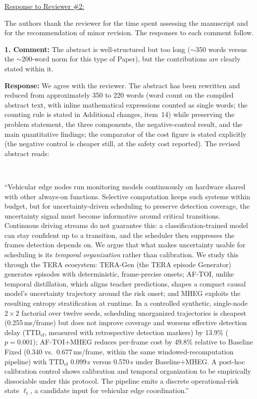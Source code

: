 \documentclass[1p,12pt,authoryear]{elsarticle}
\begin{document}
\newpage


\begin{large}
\noindent \underline{Response to Reviewer \#2:}
\end{large}

\vspace{10pt}

\noindent The authors thank the reviewer for the time spent assessing the manuscript and for the recommendation of minor revision. The responses to each comment follow.

\vspace{0.5cm}
\noindent \textbf{1. Comment:} The abstract is well-structured but too long ($\sim$350 words versus the $\sim$200-word norm for this type of Paper), but the contributions are clearly stated within it.

\vspace{2mm}
\noindent \textbf{Response:} We agree with the reviewer. The abstract has been rewritten and reduced from approximately 350 to 220 words (word count on the compiled abstract text, with inline mathematical expressions counted as single words; the counting rule is stated in Additional changes, item~14) while preserving the problem statement, the three components, the negative-control result, and the main quantitative findings; the comparator of the cost figure is stated explicitly (the negative control is cheaper still, at the safety cost reported). The revised abstract reads:

~

``Vehicular edge nodes run monitoring models continuously on hardware shared with other always-on functions. Selective computation keeps such systems within budget, but for uncertainty-driven scheduling to preserve detection coverage, the uncertainty signal must become informative around critical transitions. Continuous driving streams do not guarantee this: a classification-trained model can stay confident up to a transition, and the scheduler then suppresses the frames detection depends on. We argue that what makes uncertainty usable for scheduling is its \emph{temporal organization} rather than calibration. We study this through the TERA ecosystem: TERA-Gen (the TERA episode Generator) generates episodes with deterministic, frame-precise onsets; AF-TOI, unlike temporal distillation, which aligns teacher predictions, shapes a compact causal model's uncertainty trajectory around the risk onset; and MHEG exploits the resulting entropy stratification at runtime. In a controlled synthetic, single-node $2\times2$ factorial over twelve seeds, scheduling unorganized trajectories is cheapest (0.255\,ms/frame) but does not improve coverage and worsens effective detection delay ($\mathrm{TTD}_{\mathrm{ef}}$, measured with retrospective detection markers) by 13.9\% ($p=0.001$); AF-TOI+MHEG reduces per-frame cost by 49.8\% relative to Baseline Fixed (0.340 vs.\ 0.677\,ms/frame, within the same windowed-recomputation pipeline) with $\mathrm{TTD}_{\mathrm{ef}}$ 0.099\,s versus 0.570\,s under Baseline+MHEG. A post-hoc calibration control shows calibration and temporal organization to be empirically dissociable under this protocol. The pipeline emits a discrete operational-risk state $\ell_t$, a candidate input for vehicular edge coordination.''
\end{document}
